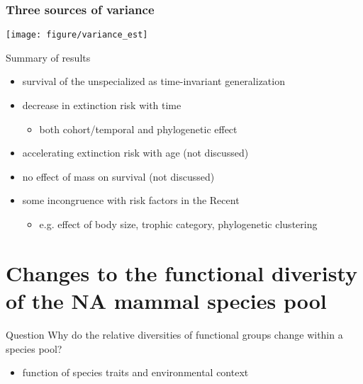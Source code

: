 \documentclass{beamer}
\begin{document}
\begin{frame}
  \frametitle{Three sources of variance}

  \begin{center}
    \texttt{[image: figure/variance\_est]}
  \end{center}

  \tiny{}
\end{frame}

\begin{frame}
  \begin{block}{Summary of results}
    \begin{itemize}
      \item survival of the unspecialized as time-invariant generalization
      \item decrease in extinction risk with time
        \begin{itemize}
          \item both cohort/temporal and phylogenetic effect
        \end{itemize}
      \item accelerating extinction risk with age (not discussed)
      \item no effect of mass on survival (not discussed)
      \item some incongruence with risk factors in the Recent
        \begin{itemize}
          \item e.g. effect of body size, trophic category, phylogenetic clustering
        \end{itemize}
    \end{itemize}
  \end{block}
\end{frame}



\section{Changes to the functional diveristy of the NA mammal species pool}

\begin{frame}
  \begin{alertblock}{Question}
    \alert{Why} do the relative diversities of functional groups change within a species pool?
    \begin{itemize}
      \item function of \alert{species traits} and \alert{environmental context}
    \end{itemize}
  \end{alertblock}
\end{frame}
\end{document}
